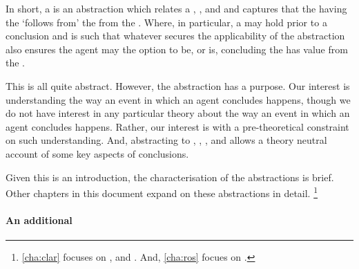 \begin{note}
  In short, a \ros{} is an abstraction which relates a , , and  and captures that the \prop{} having the \val{} `follows from' the \pool{} from the \agpe{}.
  Where, in particular, a \ros{} may hold prior to a conclusion and is such that whatever secures the applicability of the abstraction also ensures the agent may the option to be, or is, concluding the  has value  from the .

  This is all quite abstract.
  However, the abstraction has a purpose.
  Our interest is understanding the way an event in which an agent concludes happens, though we do not have interest in any particular theory about the way an event in which an agent concludes happens.
  Rather, our interest is with a pre-theoretical constraint on such understanding.
  And, abstracting to , , , and  allows a theory neutral account of some key aspects of conclusions.

  Given this is an introduction, the characterisation of the abstractions is brief.
  Other chapters in this document expand on these abstractions in detail.%
  \footnote{
    \autoref{cha:clar} focuses on ,  and .
    And, \autoref{cha:ros} focues on .
  }
\end{note}



\paragraph*{An additional }


